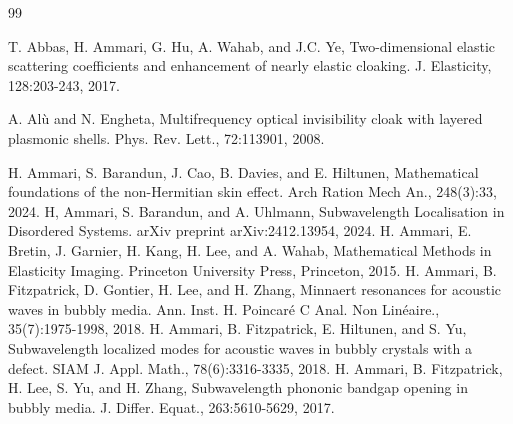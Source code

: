 \documentclass[10pt,reqno,oneside]{amsart}%
\theoremstyle{definition}
\theoremstyle{remark}
\numberwithin{equation}{section}
\numberwithin{equation}{section}
\begin{document}
\begin{thebibliography}{99}%

T. Abbas, H. Ammari, G. Hu, A. Wahab, and J.C. Ye, Two-dimensional elastic scattering coefficients and enhancement of nearly elastic cloaking. J. Elasticity, 128:203-243, 2017.


A. Al\`{u} and N. Engheta, Multifrequency optical invisibility cloak with layered plasmonic shells. Phys. Rev. Lett.,
72:113901, 2008.

H. Ammari, S. Barandun, J. Cao, B. Davies, and E. Hiltunen, Mathematical foundations of the non-Hermitian skin effect. Arch Ration Mech An., 248(3):33, 2024.
H, Ammari, S. Barandun, and A. Uhlmann, Subwavelength Localisation in Disordered Systems. arXiv preprint arXiv:2412.13954, 2024.
H. Ammari, E. Bretin, J. Garnier, H. Kang, H. Lee, and A. Wahab, Mathematical Methods in Elasticity Imaging. Princeton University Press, Princeton, 2015.
H. Ammari, B. Fitzpatrick, D. Gontier, H. Lee, and H. Zhang, Minnaert resonances for acoustic waves in bubbly media. Ann. Inst. H. Poincar\'e C Anal. Non Lin\'eaire., 35(7):1975-1998, 2018.
H. Ammari, B. Fitzpatrick, E. Hiltunen, and S. Yu, Subwavelength localized modes for acoustic waves in bubbly crystals with a defect. SIAM J. Appl. Math., 78(6):3316-3335, 2018.
H. Ammari, B. Fitzpatrick, H. Lee, S. Yu, and H. Zhang, Subwavelength phononic bandgap opening in bubbly media. J. Differ. Equat., 263:5610-5629, 2017.


\end{thebibliography}
\end{document}
